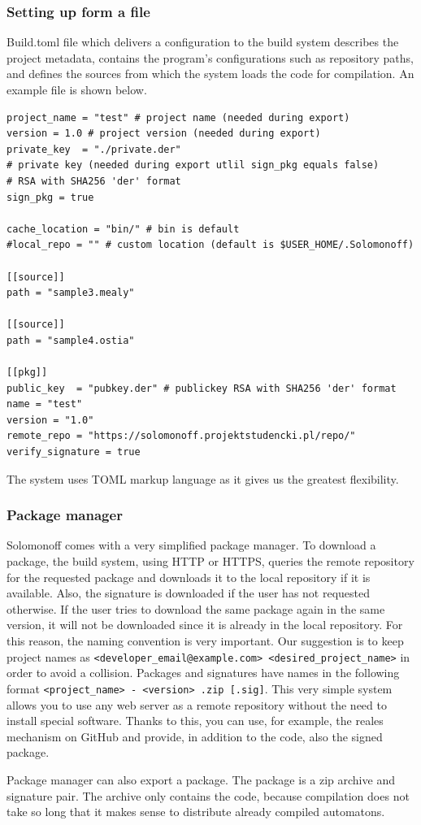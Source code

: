 \hypertarget{setting-up-form-a-file}{%
\subsubsection{Setting up form a file}\label{setting-up-form-a-file}}

Build.toml file which delivers a configuration to the build system
describes the project metadata, contains the program's configurations
such as repository paths, and defines the sources from which the system
loads the code for compilation. An example file is shown below.

\begin{verbatim}
project_name = "test" # project name (needed during export)
version = 1.0 # project version (needed during export)
private_key  = "./private.der" 
# private key (needed during export utlil sign_pkg equals false) 
# RSA with SHA256 'der' format
sign_pkg = true

cache_location = "bin/" # bin is default 
#local_repo = "" # custom location (default is $USER_HOME/.Solomonoff)

[[source]]
path = "sample3.mealy"

[[source]]
path = "sample4.ostia"

[[pkg]]
public_key  = "pubkey.der" # publickey RSA with SHA256 'der' format
name = "test" 
version = "1.0"
remote_repo = "https://solomonoff.projektstudencki.pl/repo/"
verify_signature = true
\end{verbatim}

The system uses TOML markup language as it gives us the greatest
flexibility.

\hypertarget{package-manager}{%
\subsubsection{Package manager}\label{package-manager}}

Solomonoff comes with a very simplified package manager. To download a
package, the build system, using HTTP or HTTPS, queries the remote
repository for the requested package and downloads it to the local
repository if it is available. Also, the signature is downloaded if the
user has not requested otherwise. If the user tries to download the same
package again in the same version, it will not be downloaded since it is
already in the local repository. For this reason, the naming convention
is very important. Our suggestion is to keep project names as
\texttt{\textless{}developer\_email@example.com\textgreater{}\ \textless{}desired\_project\_name\textgreater{}}
in order to avoid a collision. Packages and signatures have names in the
following format
\texttt{\textless{}project\_name\textgreater{}\ -\ \textless{}version\textgreater{}\ .zip\ {[}.sig{]}}.
This very simple system allows you to use any web server as a remote
repository without the need to install special software. Thanks to this,
you can use, for example, the reales mechanism on GitHub and provide, in
addition to the code, also the signed package.

Package manager can also export a package. The package is a zip archive
and signature pair. The archive only contains the code, because
compilation does not take so long that it makes sense to distribute
already compiled automatons.

